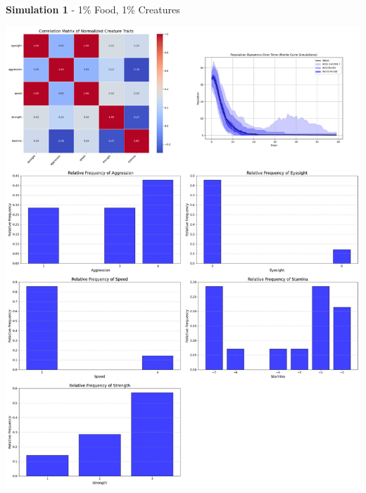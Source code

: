 \documentclass{article}
\begin{document}
\textbf{Simulation 1} - 1\% Food, 1\% Creatures
\begin{center}
    \includegraphics[scale=0.21]{tests/2.1.jpg}
\end{center}
\end{document}
